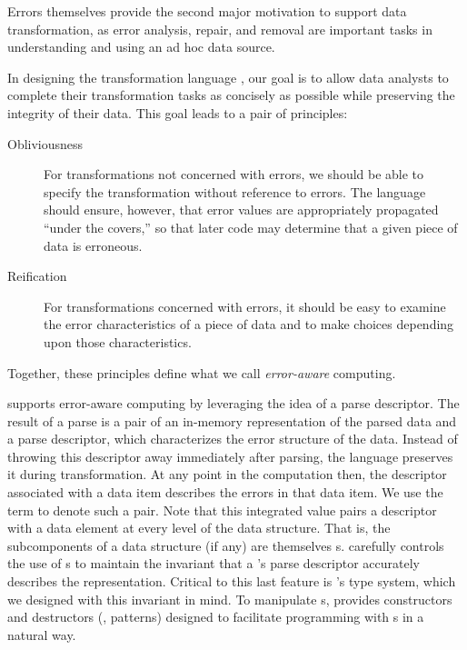 Errors themselves provide the second major motivation to support data transformation, as error analysis, repair, and removal are important tasks in understanding and using an ad hoc data source.

In designing the transformation language \datatype{}, our goal is to allow data analysts to complete their transformation tasks as concisely as possible while preserving the integrity of their data.  This goal leads to a pair of principles:
%
\begin{description}
\item[Obliviousness] For transformations not concerned with errors, we should be able to specify the transformation without reference to errors.  The language should ensure, however, that error values are appropriately propagated ``under the covers,'' so that later code may determine that a given piece of data is erroneous.
\item[Reification] For transformations concerned with errors, it should be easy to examine the error characteristics of a piece of data and to make choices depending upon those characteristics.
\end{description}
%
Together, these principles define what we call \textit{error-aware} computing.

\datatype{} supports error-aware computing by leveraging the idea of a parse descriptor.   The result of a parse is a pair of an in-memory representation of the parsed data and a parse descriptor, which characterizes the error structure of the data.  Instead of throwing this descriptor away immediately after parsing, the language preserves it during transformation.  At any point in the computation then, the descriptor associated with a data item describes the errors in that data item.  We use the term \pvalue{} to denote such a pair.  Note that this integrated value pairs a descriptor with a data element at every level of the data structure. That is, the subcomponents of a data structure (if any) are themselves \pvalue{}s.
\datatype{} carefully controls the use of \pvalue{}s to maintain the invariant that a \pvalue{}'s parse descriptor accurately describes the representation.
Critical to this last feature is \datatype{}'s type system, which we 
designed with this invariant in mind.
To manipulate \pvalue{}s, \datatype{} provides constructors and destructors (\ie{}, patterns) designed to facilitate programming with \pvalue{}s in a natural way.


